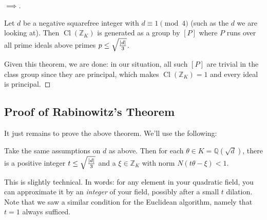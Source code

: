 \begin{proof}[$\implies$]
\begin{theorem}

Let \(d\) be a negative squarefree integer with \(d \equiv 1 \pmod 4\)
(such as the \(d\) we are looking at). Then
\({ \operatorname{Cl}} ({\mathbb{Z}}_K)\) is generated as a group by
\([P]\) where \(P\) runs over all prime ideals above primes
\(p \leq \sqrt{{\left\lvert {d} \right\rvert}\over 3 }\).

\end{theorem}

Given this theorem, we are done: in our situation, all such \([P]\) are
trivial in the class group since they are principal, which makes
\({ \operatorname{Cl}} ({\mathbb{Z}}_K) = 1\) and every ideal is
principal.

\end{proof}

\hypertarget{proof-of-rabinowitzs-theorem}{%
\subsection{Proof of Rabinowitz's
Theorem}\label{proof-of-rabinowitzs-theorem}}

\begin{remark}

It just remains to prove the above theorem. We'll use the following:

\end{remark}

\begin{proposition}

Take the same assumptions on \(d\) as above. Then for each
\(\theta \in K = {\mathbb{Q}}( \sqrt{d} )\), there is a positive integer
\(t \leq \sqrt{{\left\lvert {d} \right\rvert}\over 3 }\) and a
\(\xi \in {\mathbb{Z}}_K\) with norm \(N(t\theta - \xi) < 1\).

\end{proposition}

\begin{remark}

This is slightly technical. In words: for any element in your quadratic
field, you can approximate it by an \emph{integer} of your field,
possibly after a small \(t\) dilation. Note that we saw a similar
condition for the Euclidean algorithm, namely that \(t=1\) always
sufficed.

\end{remark}


